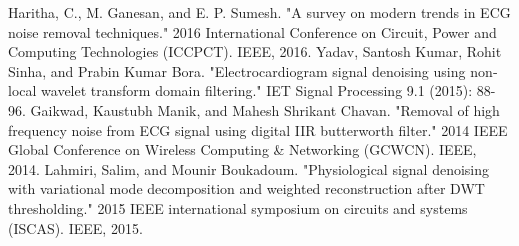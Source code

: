 \documentclass[dvipdfmx]{article}
\begin{document}
\begin{thebibliography}{99}
\bibitem Haritha, C., M. Ganesan, and E. P. Sumesh. "A survey on modern trends in ECG noise removal techniques." 2016 International Conference on Circuit, Power and Computing Technologies (ICCPCT). IEEE, 2016.
\bibitem Yadav, Santosh Kumar, Rohit Sinha, and Prabin Kumar Bora. "Electrocardiogram signal denoising using non‐local wavelet transform domain filtering." IET Signal Processing 9.1 (2015): 88-96.
\bibitem Gaikwad, Kaustubh Manik, and Mahesh Shrikant Chavan. "Removal of high frequency noise from ECG signal using digital IIR butterworth filter." 2014 IEEE Global Conference on Wireless Computing \& Networking (GCWCN). IEEE, 2014.
\bibitem Lahmiri, Salim, and Mounir Boukadoum. "Physiological signal denoising with variational mode decomposition and weighted reconstruction after DWT thresholding." 2015 IEEE international symposium on circuits and systems (ISCAS). IEEE, 2015.
\end{thebibliography}
\end{document}
